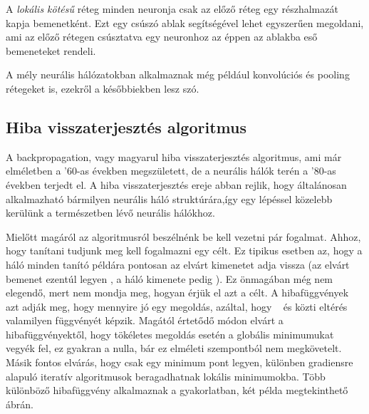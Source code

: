 A \emph{lokális kötésű} réteg minden neuronja csak az előző réteg egy részhalmazát kapja bemenetként. Ezt egy csúszó ablak segítségével lehet egyszerűen megoldani, ami az előző rétegen csúsztatva egy neuronhoz az éppen az ablakba eső bemeneteket rendeli.

A mély neurális hálózatokban alkalmaznak még például konvolúciós és \foreignlanguage{english}{pooling} rétegeket is, ezekről a későbbiekben lesz szó.

\subsection{Hiba visszaterjesztés algoritmus}

A \foreignlanguage{english}{backpropagation}, vagy magyarul hiba visszaterjesztés algoritmus, ami már elméletben a '60-as években megszületett, de a neurális hálók terén a '80-as években terjedt el. A hiba visszaterjesztés ereje abban rejlik, hogy általánosan alkalmazható bármilyen neurális háló struktúrára,így egy lépéssel közelebb kerülünk a természetben lévő neurális hálókhoz.

Mielőtt magáról az algoritmusról beszélnénk be kell vezetni pár fogalmat. Ahhoz, hogy tanítani tudjunk meg kell fogalmazni egy célt. Ez tipikus esetben az, hogy a háló minden tanító példára pontosan az elvárt kimenetet adja vissza (az elvárt bemenet ezentúl legyen \y, a háló kimenete pedig \yvesszo). Ez önmagában még nem elegendő, mert nem mondja meg, hogyan érjük el azt a célt. A hibafüggvények azt adják meg, hogy mennyire jó egy megoldás, azáltal, hogy \y ~ és \yvesszo közti eltérés valamilyen függvényét képzik. Magától értetődő módon elvárt a hibafüggvényektől, hogy tökéletes megoldás esetén a globális minimumukat vegyék fel, ez gyakran a nulla, bár ez elméleti szempontból nem megkövetelt. Másik fontos elvárás, hogy csak egy minimum pont legyen, különben gradiensre alapuló iteratív algoritmusok beragadhatnak lokális minimumokba. 
Több különböző hibafüggvény alkalmaznak a gyakorlatban, két példa megtekinthető  ábrán.

